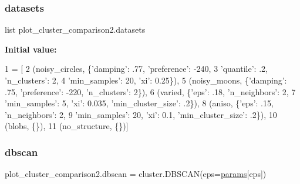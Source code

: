 \subsubsection{\texorpdfstring{datasets}{datasets}}
{\footnotesize\ttfamily list plot\+\_\+cluster\+\_\+comparison2.\+datasets}

{\bfseries Initial value\+:}
\begin{DoxyCode}
1 =  [
2     (noisy\_circles, \{\textcolor{stringliteral}{'damping'}: .77, \textcolor{stringliteral}{'preference'}: -240,
3                      \textcolor{stringliteral}{'quantile'}: .2, \textcolor{stringliteral}{'n\_clusters'}: 2,
4                      \textcolor{stringliteral}{'min\_samples'}: 20, \textcolor{stringliteral}{'xi'}: 0.25\}),
5     (noisy\_moons, \{\textcolor{stringliteral}{'damping'}: .75, \textcolor{stringliteral}{'preference'}: -220, \textcolor{stringliteral}{'n\_clusters'}: 2\}),
6     (varied, \{\textcolor{stringliteral}{'eps'}: .18, \textcolor{stringliteral}{'n\_neighbors'}: 2,
7               \textcolor{stringliteral}{'min\_samples'}: 5, \textcolor{stringliteral}{'xi'}: 0.035, \textcolor{stringliteral}{'min\_cluster\_size'}: .2\}),
8     (aniso, \{\textcolor{stringliteral}{'eps'}: .15, \textcolor{stringliteral}{'n\_neighbors'}: 2,
9              \textcolor{stringliteral}{'min\_samples'}: 20, \textcolor{stringliteral}{'xi'}: 0.1, \textcolor{stringliteral}{'min\_cluster\_size'}: .2\}),
10     (blobs, \{\}),
11     (no\_structure, \{\})]
\end{DoxyCode}
\mbox{\label{namespaceplot__cluster__comparison2_a7047ab458a4083bd340ebb4e66f32f31}} 
\subsubsection{\texorpdfstring{dbscan}{dbscan}}
{\footnotesize\ttfamily plot\+\_\+cluster\+\_\+comparison2.\+dbscan = cluster.\+D\+B\+S\+C\+AN(eps=\hyperlink{namespaceplot__cluster__comparison2_a2c45c06ff9f589e117a4d45eca4dd71d}{params}\mbox{[}\textquotesingle{}eps\textquotesingle{}\mbox{]})}

\mbox{\label{namespaceplot__cluster__comparison2_af59a10b0d3989f1278dcb9cd28a53903}} 
